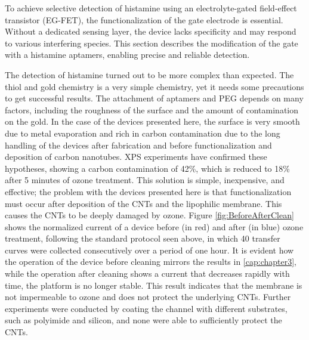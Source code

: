 To achieve selective detection of histamine using an electrolyte-gated field-effect transistor (EG-FET), the functionalization of the gate electrode is essential. Without a dedicated sensing layer, the device lacks specificity and may respond to various interfering species. This section describes the modification of the gate with a histamine aptamers, enabling precise and reliable detection.

The detection of histamine turned out to be more complex than expected. The thiol and gold chemistry is a very simple chemistry, yet it needs some precautions to get successful results. The attachment of aptamers and PEG depends on many factors, including the roughness of the surface and the amount of contamination on the gold. In the case of the devices presented here, the surface is very smooth due to metal evaporation and rich in carbon contamination due to the long handling of the devices after fabrication and before functionalization and deposition of carbon nanotubes. XPS experiments have confirmed these hypotheses, showing a carbon contamination of 42\%, which is reduced to 18\% after 5 minutes of ozone treatment.
This solution is simple, inexpensive, and effective; the problem with the devices presented here is that functionalization must occur after deposition of the CNTs and the lipophilic membrane. This causes the CNTs to be deeply damaged by ozone. Figure \ref{fig:BeforeAfterClean} shows the normalized current of a device before (in red) and after (in blue) ozone treatment, following the standard protocol seen above, in which 40 transfer curves were collected consecutively over a period of one hour. It is evident how the operation of the device before cleaning mirrors the results in \ref{cap:chapter3}, while the operation after cleaning shows a current that decreases rapidly with time, \ie{} the platform is no longer stable. This result indicates that the membrane is not impermeable to ozone and does not protect the underlying CNTs. Further experiments were conducted by coating the channel with different substrates, such as polyimide and silicon, and none were able to sufficiently protect the CNTs.

